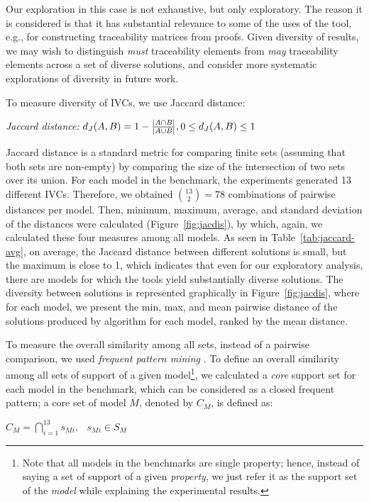 Our exploration in this case is not exhaustive, but only exploratory.
The reason it is considered is that it has substantial relevance to
some of the uses of the tool, e.g., for constructing traceability
matrices from proofs. Given diversity of results, we may wish to
distinguish {\em must} traceability elements from {\em may}
traceability elements across a set of diverse solutions, and consider
more systematic explorations of diversity in future work.

To measure diversity of IVCs, we use Jaccard distance:
\begin{definition}{\emph{Jaccard distance:}}
  \label{def:dj}
  $d_J(\small{A}, \small{B}) = 1 - \frac{|A \cap B|}{|A \cup B|} ,\\ 0 \leq d_J(\small{A}, \small{B}) \leq 1$
\end{definition}
\noindent Jaccard distance is a standard metric for comparing finite
sets (assuming that both sets are non-empty) by comparing the size of
the intersection of two sets over its union. For each model in the
benchmark, the experiments generated 13 different IVCs. Therefore, we
obtained $\binom{13}{2} = 78$ combinations of pairwise distances per
model. Then, minimum, maximum, average, and standard deviation of the
distances were calculated (Figure~\ref{fig:jacdis}), by which, again,
we calculated these four measures among all models. As seen in
Table~\ref{tab:jaccard-avg}, on average, the Jaccard distance between
different solutions is small, but the maximum is close to 1, which
indicates that even for our exploratory analysis, there are models for
which the tools yield substantially diverse solutions. The diversity
between solutions is represented graphically in
Figure~\ref{fig:jacdis}, where for each model, we present the min,
max, and mean pairwise distance of the solutions produced by algorithm
\ucalg for each model, ranked by the mean distance.

\iffalse
{}

To measure the overall similarity among all sets, instead of a pairwise comparison, we used \emph{frequent pattern mining} \cite{han2007frequent}. To define an overall similarity among all sets of support of a given model\footnote{Note that all models in the benchmarks are single property; hence, instead of saying a set of support of a given \emph{property}, we just refer it as the support set of the \emph{model} while explaining the experimental results.}, we calculated a \emph{core} support set for each model in the benchmark, which can be considered as a closed frequent pattern; a core set of model $M$, denoted by $C_M$, is defined as:
\begin{definition}
  \label{def:core}
  $C_M = \bigcap_{i=1}^{13} s_{Mi},   \hspace{9pt} s_{Mi} \in S_M$
\end{definition}


